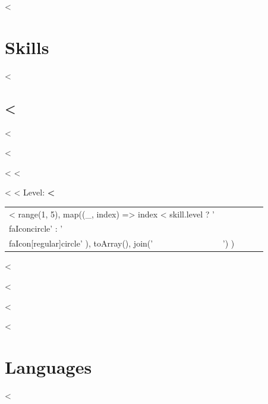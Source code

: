\documentclass{article}
\begin{document}
{%

<%
\section*{Skills}{%
  <%
  \subsection*{%
    <%
  }{%
%
    <%
      \begin{inparaenum}[]%
      <%
        \item <%
      <%
      \end{inparaenum}%
      \newline%
    <%
%
    <%
      Level: %
      \bfseries%
      <%
      \newline%
      {%
        \setlength{\tabcolsep}{1mm}%
        \color{accent-500}%
        \scriptsize%
        \begin{tabular}[b]{l l l l l}%
          <%
            range(1, 5),
            map((_, index) => index < skill.level
              ? '\\faIcon{circle}'
              : '\\faIcon[regular]{circle}'
            ),
            toArray(),
            join(' & ')
          ) %
          \\[2mm]%
        \end{tabular}%
      }%
    <%
%
  }%
  <%
}%
<%


<%
\section*{Languages}{%
  <%
}}
\end{document}
